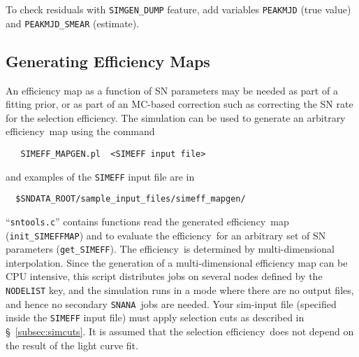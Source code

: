 \documentclass[12pt]{article}
\newcommand{\snana}{{\tt SNANA}}
\newcommand{\eff}{efficiency}
\begin{document}
To check residuals with {\tt SIMGEN\_DUMP} feature,
add variables {\tt PEAKMJD} (true value) and {\tt PEAKMJD\_SMEAR}
(estimate).

   \subsection{Generating Efficiency Maps}
   \label{subsec:simeff_genmap}

An efficiency map as a function of SN parameters may be
needed as part of a fitting prior, or as part of an
MC-based correction such as correcting the SN rate
for the selection \eff.
The simulation can be used to generate an arbitrary 
\eff\ map using the command
\begin{verbatim}
   SIMEFF_MAPGEN.pl  <SIMEFF input file>
\end{verbatim}
%
and examples of the {\tt SIMEFF} input file are in
\begin{verbatim}
  $SNDATA_ROOT/sample_input_files/simeff_mapgen/
\end{verbatim}
``{\tt sntools.c}'' contains functions read the generated 
\eff\ map  ({\tt init\_SIMEFFMAP}) and to evaluate the \eff\
for an arbitrary set of SN parameters ({\tt get\_SIMEFF}).
The \eff\ is determined by multi-dimensional interpolation.
%
Since the generation of a multi-dimensional efficiency map 
can be CPU intensive, this script distributes jobs on several 
nodes defined by the {\tt NODELIST} key, and the simulation 
runs in a mode where there are no output files, 
and hence no secondary \snana\ jobs are needed.
Your sim-input file (specified inside the {\tt SIMEFF} input file) 
must apply selection cuts as described in \S~\ref{subsec:simcuts}.
It is assumed that the selection \eff\ does not depend on
the result of the light curve fit.
\end{document}
